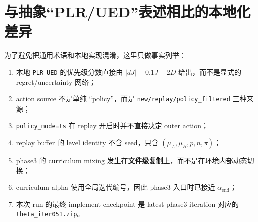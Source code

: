 \documentclass[11pt,a4paper]{ctexart}
\begin{document}
\section{与抽象“PLR/UED”表述相比的本地化差异}
为了避免把通用术语和本地实现混淆，这里只做事实列举：
\begin{enumerate}[leftmargin=2.2em,itemsep=0.25em]
    \item 本地 \texttt{PLR\_UED} 的优先级分数直接由 \(|dJ| + 0.1J - 2D\) 给出，而不是显式的 regret/uncertainty 网络；
    \item action source 不是单纯 ``policy''，而是 \texttt{new/replay/policy\_filtered} 三种来源；
    \item \texttt{policy\_mode=ts} 在 replay 开启时并不直接决定 outer action；
    \item replay buffer 的 level identity 不含 seed，只含 \((\mu_A,\mu_B,p,n,\pi)\)；
    \item phase3 的 curriculum mixing 发生在\textbf{文件级复制}上，而不是在环境内部动态切换；
    \item curriculum alpha 使用全局迭代编号，因此 phase3 入口时已接近 \(\alpha_{\text{end}}\)；
    \item 本次 run 的最终 implement checkpoint 是 latest phase3 iteration 对应的 \texttt{theta\_iter051.zip}。
\end{enumerate}
\end{document}
